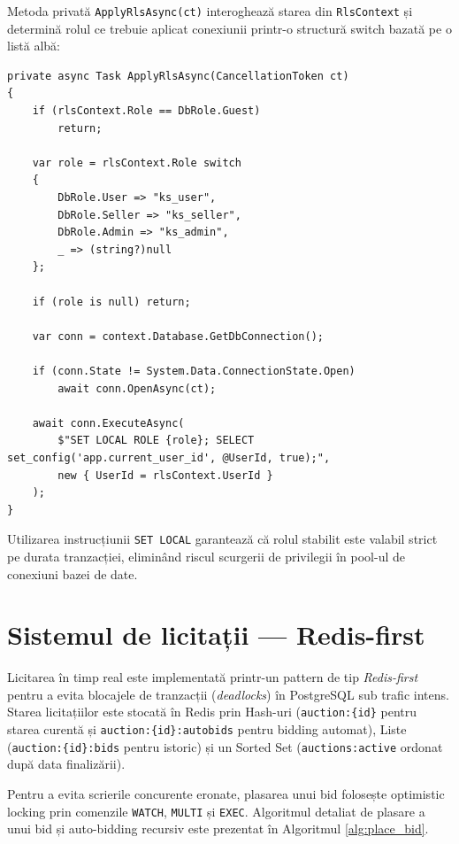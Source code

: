 Metoda privată \texttt{ApplyRlsAsync(ct)} interoghează starea din \texttt{RlsContext} și determină rolul ce trebuie aplicat conexiunii printr-o structură switch bazată pe o listă albă:

\begin{lstlisting}[language={[sharp]C}]
private async Task ApplyRlsAsync(CancellationToken ct)
{
    if (rlsContext.Role == DbRole.Guest)
        return;

    var role = rlsContext.Role switch
    {
        DbRole.User => "ks_user",
        DbRole.Seller => "ks_seller",
        DbRole.Admin => "ks_admin",
        _ => (string?)null
    };

    if (role is null) return;

    var conn = context.Database.GetDbConnection();

    if (conn.State != System.Data.ConnectionState.Open)
        await conn.OpenAsync(ct);

    await conn.ExecuteAsync(
        $"SET LOCAL ROLE {role}; SELECT set_config('app.current_user_id', @UserId, true);",
        new { UserId = rlsContext.UserId }
    );
}
\end{lstlisting}

Utilizarea instrucțiunii \texttt{SET LOCAL} garantează că rolul stabilit este valabil strict pe durata tranzacției, eliminând riscul scurgerii de privilegii în pool-ul de conexiuni bazei de date.

\section{Sistemul de licitații --- Redis-first}

Licitarea în timp real este implementată printr-un pattern de tip \textit{Redis-first} pentru a evita blocajele de tranzacții (\textit{deadlocks}) în PostgreSQL sub trafic intens. Starea licitațiilor este stocată în Redis prin Hash-uri (\texttt{auction:\{id\}} pentru starea curentă și \texttt{auction:\{id\}:autobids} pentru bidding automat), Liste (\texttt{auction:\{id\}:bids} pentru istoric) și un Sorted Set (\texttt{auctions:active} ordonat după data finalizării).

Pentru a evita scrierile concurente eronate, plasarea unui bid folosește optimistic locking prin comenzile \texttt{WATCH}, \texttt{MULTI} și \texttt{EXEC}. Algoritmul detaliat de plasare a unui bid și auto-bidding recursiv este prezentat în Algoritmul \ref{alg:place_bid}.

